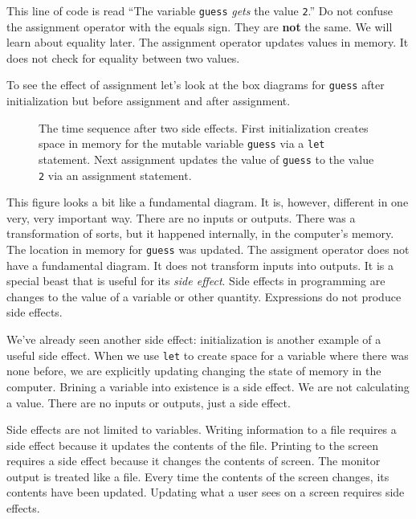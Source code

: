 This line of code is read ``The variable \texttt{guess} \emph{gets} the value \texttt{2}.''  Do not confuse the assignment operator with the equals sign. They are \textbf{not} the same. We will learn about equality later. The assignment operator updates values in memory. It does not check for equality between two values.

To see the effect of assignment let's look at the box diagrams for \texttt{guess} after initialization but before assignment and after assignment.

\begin{figure}
  
  \caption{\label{fig:intro-variable-assignment} The time sequence after two side effects. First initialization creates space in memory for the mutable variable \texttt{guess} via a \texttt{let} statement. Next assignment updates the value of \texttt{guess} to the value \texttt{2} via an assignment statement.}
\end{figure}

This figure looks a bit like a fundamental diagram. It is, however, different in one very, very important way. There are no inputs or outputs. There was a transformation of sorts, but it happened internally, in the computer's memory. The location in memory for \texttt{guess} was updated. The assigment operator does not have a fundamental diagram. It does not transform inputs into outputs. It is a special beast that is useful for its \emph{side effect}. Side effects in programming are changes to the value of a variable or other quantity. Expressions do not produce side effects.

We've already seen another side effect: initialization is another example of a useful side effect. When we use \texttt{let} to create space for a variable where there was none before, we are explicitly updating changing the state of memory in the computer. Brining a variable into existence is a side effect. We are not calculating a value. There are no inputs or outputs, just a side effect.

Side effects are not limited to variables. Writing information to a file requires a side effect because it updates the contents of the file. Printing to the screen requires a side effect because it changes the contents of screen. The monitor output is treated like a file. Every time the contents of the screen changes, its contents have been updated. Updating what a user sees on a screen requires side effects.

